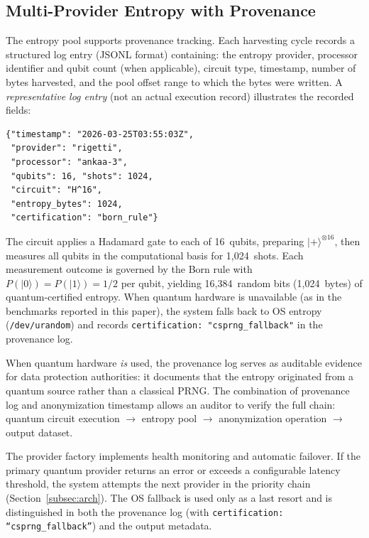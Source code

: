 \documentclass[journal]{IEEEtran}
\begin{document}
\subsection{Multi-Provider Entropy with Provenance}
\label{subsec:provenance}

The entropy pool supports provenance tracking. Each harvesting cycle records a structured log entry (JSONL format) containing: the entropy provider, processor identifier and qubit count (when applicable), circuit type, timestamp, number of bytes harvested, and the pool offset range to which the bytes were written. A \emph{representative log entry} (not an actual execution record) illustrates the recorded fields:

{\small\begin{verbatim}
{"timestamp": "2026-03-25T03:55:03Z",
 "provider": "rigetti",
 "processor": "ankaa-3",
 "qubits": 16, "shots": 1024,
 "circuit": "H^16",
 "entropy_bytes": 1024,
 "certification": "born_rule"}
\end{verbatim}}

The circuit applies a Hadamard gate to each of 16~qubits, preparing $|{+}\rangle^{\otimes 16}$, then measures all qubits in the computational basis for 1,024~shots. Each measurement outcome is governed by the Born rule with $P(|0\rangle) = P(|1\rangle) = 1/2$ per qubit, yielding 16,384~random bits (1,024~bytes) of quantum-certified entropy. When quantum hardware is unavailable (as in the benchmarks reported in this paper), the system falls back to OS entropy (\texttt{/dev/urandom}) and records \texttt{certification: "csprng\_fallback"} in the provenance log.

When quantum hardware \emph{is} used, the provenance log serves as auditable evidence for data protection authorities: it documents that the entropy originated from a quantum source rather than a classical PRNG. The combination of provenance log and anonymization timestamp allows an auditor to verify the full chain: quantum circuit execution $\to$ entropy pool $\to$ anonymization operation $\to$ output dataset.

The provider factory implements health monitoring and automatic failover. If the primary quantum provider returns an error or exceeds a configurable latency threshold, the system attempts the next provider in the priority chain (Section~\ref{subsec:arch}). The OS fallback is used only as a last resort and is distinguished in both the provenance log (with \texttt{certification: ``csprng\_fallback''}) and the output metadata.
\end{document}
